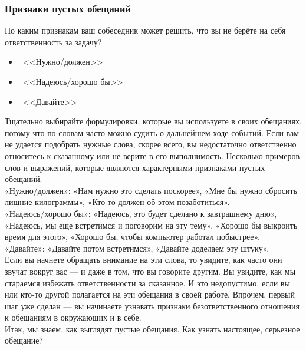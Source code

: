 \documentclass{../industrial-development}
\begin{document}
\begin{frame} \frametitle{Признаки пустых обещаний}
По каким признакам ваш собеседник может решить, что вы не берёте на себя ответственность за задачу?
\begin{itemize}
	\item  <<Нужно/должен>>
	\item  <<Надеюсь/хорошо бы>>
	\item  <<Давайте>>
\end{itemize}
\end{frame}
\lecturenotes
Тщательно выбирайте формулировки, которые вы используете в своих обещаниях, потому что по словам часто можно судить о дальнейшем ходе событий. Если вам не удается подобрать нужные слова, скорее всего, вы недостаточно ответственно относитесь к сказанному или не верите в его выполнимость. Несколько примеров слов и выражений, которые являются характерными признаками пустых обещаний.\\
«Нужно/должен»: «Нам нужно это сделать поскорее», «Мне бы нужно сбросить лишние килограммы», «Кто-то должен об этом позаботиться».\\
«Надеюсь/хорошо бы»: «Надеюсь, это будет сделано к завтрашнему дню», «Надеюсь, мы еще встретимся и поговорим на эту тему», «Хорошо бы выкроить время для этого», «Хорошо бы, чтобы компьютер работал побыстрее».\\
«Давайте»: «Давайте потом встретимся», «Давайте доделаем эту штуку».\\
Если вы начнете обращать внимание на эти слова, то увидите, как часто они звучат вокруг вас — и даже в том, что вы говорите другим. Вы увидите, как мы стараемся избежать ответственности за сказанное. И это недопустимо, если вы или кто-то другой полагается на эти обещания в своей работе. Впрочем, первый шаг уже сделан — вы начинаете узнавать признаки безответственного отношения к обещаниям в окружающих и в себе.\\
Итак, мы знаем, как выглядят пустые обещания. Как узнать настоящее, серьезное обещание?
\end{document}

